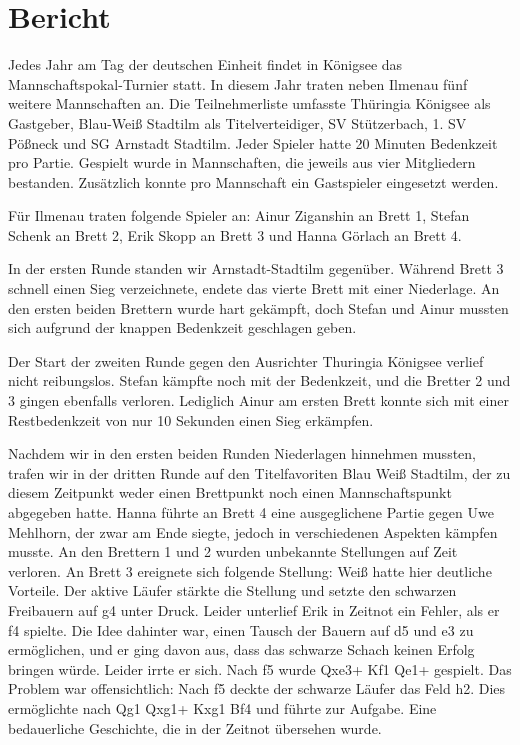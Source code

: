 \documentclass[a4paper,german]{tui-algo-seminar}
\title{\inhalt}
\author{Erik Skopp}
\newcommand{\inhalt}{29. Mannschafts Schnellschach Pokalturnier in Königssee 2023}
\begin{document}
\maketitle
\begin{abstract}
Bericht über das \inhalt
\end{abstract}

\section{Bericht}
Jedes Jahr am Tag der deutschen Einheit findet in Königsee das Mannschaftspokal-Turnier statt. In diesem Jahr traten neben Ilmenau fünf weitere Mannschaften an. Die Teilnehmerliste umfasste Thüringia Königsee als Gastgeber, Blau-Weiß Stadtilm als Titelverteidiger, SV Stützerbach, 1. SV Pößneck und SG Arnstadt Stadtilm. Jeder Spieler hatte 20 Minuten Bedenkzeit pro Partie. Gespielt wurde in Mannschaften, die jeweils aus vier Mitgliedern bestanden. Zusätzlich konnte pro Mannschaft ein Gastspieler eingesetzt werden.

Für Ilmenau traten folgende Spieler an: Ainur Ziganshin an Brett 1, Stefan Schenk an Brett 2, Erik Skopp an Brett 3 und Hanna Görlach an Brett 4.

In der ersten Runde standen wir Arnstadt-Stadtilm gegenüber. Während Brett 3 schnell einen Sieg verzeichnete, endete das vierte Brett mit einer Niederlage. An den ersten beiden Brettern wurde hart gekämpft, doch Stefan und Ainur mussten sich aufgrund der knappen Bedenkzeit geschlagen geben.

Der Start der zweiten Runde gegen den Ausrichter Thuringia Königsee verlief nicht reibungslos. Stefan kämpfte noch mit der Bedenkzeit, und die Bretter 2 und 3 gingen ebenfalls verloren. Lediglich Ainur am ersten Brett konnte sich mit einer Restbedenkzeit von nur 10 Sekunden einen Sieg erkämpfen.

Nachdem wir in den ersten beiden Runden Niederlagen hinnehmen mussten, trafen wir in der dritten Runde auf den Titelfavoriten Blau Weiß Stadtilm, der zu diesem Zeitpunkt weder einen Brettpunkt noch einen Mannschaftspunkt abgegeben hatte. Hanna führte an Brett 4 eine ausgeglichene Partie gegen Uwe Mehlhorn, der zwar am Ende siegte, jedoch in verschiedenen Aspekten kämpfen musste. An den Brettern 1 und 2 wurden unbekannte Stellungen auf Zeit verloren. An Brett 3 ereignete sich folgende Stellung: Weiß hatte hier deutliche Vorteile. Der aktive Läufer stärkte die Stellung und setzte den schwarzen Freibauern auf g4 unter Druck. Leider unterlief Erik in Zeitnot ein Fehler, als er f4 spielte. Die Idee dahinter war, einen Tausch der Bauern auf d5 und e3 zu ermöglichen, und er ging davon aus, dass das schwarze Schach keinen Erfolg bringen würde. Leider irrte er sich. Nach f5 wurde Qxe3+ Kf1 Qe1+ gespielt. Das Problem war offensichtlich: Nach f5 deckte der schwarze Läufer das Feld h2. Dies ermöglichte nach Qg1 Qxg1+ Kxg1 Bf4 und führte zur Aufgabe. Eine bedauerliche Geschichte, die in der Zeitnot übersehen wurde.
\end{document}
